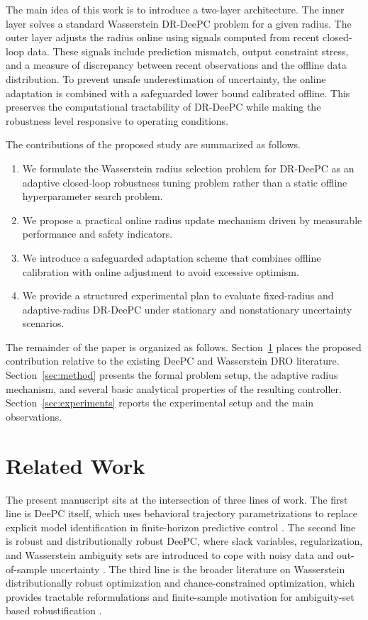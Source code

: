 \documentclass[conference]{IEEEtran}
\begin{document}
The main idea of this work is to introduce a two-layer architecture. The inner layer solves a standard Wasserstein DR-DeePC problem for a given radius. The outer layer adjusts the radius online using signals computed from recent closed-loop data. These signals include prediction mismatch, output constraint stress, and a measure of discrepancy between recent observations and the offline data distribution. To prevent unsafe underestimation of uncertainty, the online adaptation is combined with a safeguarded lower bound calibrated offline. This preserves the computational tractability of DR-DeePC while making the robustness level responsive to operating conditions.

The contributions of the proposed study are summarized as follows.
\begin{enumerate}
    \item We formulate the Wasserstein radius selection problem for DR-DeePC as an adaptive closed-loop robustness tuning problem rather than a static offline hyperparameter search problem.
    \item We propose a practical online radius update mechanism driven by measurable performance and safety indicators.
    \item We introduce a safeguarded adaptation scheme that combines offline calibration with online adjustment to avoid excessive optimism.
    \item We provide a structured experimental plan to evaluate fixed-radius and adaptive-radius DR-DeePC under stationary and nonstationary uncertainty scenarios.
\end{enumerate}

The remainder of the paper is organized as follows. Section~\ref{sec:related} places the proposed contribution relative to the existing DeePC and Wasserstein DRO literature. Section~\ref{sec:method} presents the formal problem setup, the adaptive radius mechanism, and several basic analytical properties of the resulting controller. Section~\ref{sec:experiments} reports the experimental setup and the main observations.

\section{Related Work}
\label{sec:related}
The present manuscript sits at the intersection of three lines of work. The first line is DeePC itself, which uses behavioral trajectory parametrizations to replace explicit model identification in finite-horizon predictive control \cite{Coulson2019DeePC}. The second line is robust and distributionally robust DeePC, where slack variables, regularization, and Wasserstein ambiguity sets are introduced to cope with noisy data and out-of-sample uncertainty \cite{Coulson2019Regularized,Coulson2022DRCCDeePC}. The third line is the broader literature on Wasserstein distributionally robust optimization and chance-constrained optimization, which provides tractable reformulations and finite-sample motivation for ambiguity-set based robustification \cite{EsfahaniKuhn2018,HotaCherukuriLygeros2019}.
\end{document}
